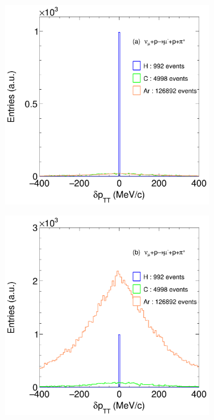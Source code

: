 \begin{figure}[!ht]
     \centering
     \begin{subfigure}[b]{0.48\textwidth}
         \centering
         \includegraphics[width=\textwidth]{figures/ch6-TKI/1D/MCSt_dpTT_numuCC_.png}
         \caption{}
         \label{fig:MCScaled_Targets}
     \end{subfigure}
     \begin{subfigure}[b]{0.48\textwidth}
         \centering
         \includegraphics[width=\textwidth]{figures/ch6-TKI/1D/MCSt_dpTT_numuCC_NotNorm.png}

\end{subfigure}
\end{figure}
